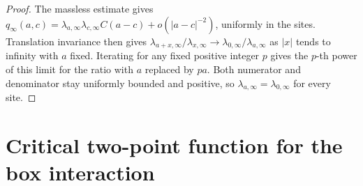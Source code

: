 \documentclass[11pt]{article}
\begin{document}
\begin{proof}
The massless estimate gives
\(q_\infty(a,c)=\lambda_{a,\infty}\lambda_{c,\infty}C(a-c)
+o(|a-c|^{-2})\), uniformly in the sites. Translation invariance
then gives
\(\lambda_{a+x,\infty}/\lambda_{x,\infty}
\to\lambda_{0,\infty}/\lambda_{a,\infty}\) as \(|x|\) tends
to infinity with \(a\) fixed. Iterating for any fixed positive
integer \(p\) gives the \(p\)-th power of this limit for the
ratio with \(a\) replaced by \(pa\). Both numerator and
denominator stay uniformly bounded and positive, so
\(\lambda_{a,\infty}=\lambda_{0,\infty}\) for every site.
\end{proof}


\section{Critical two-point function for the box interaction}
\label{sec:physical-conclusion}
\end{document}
